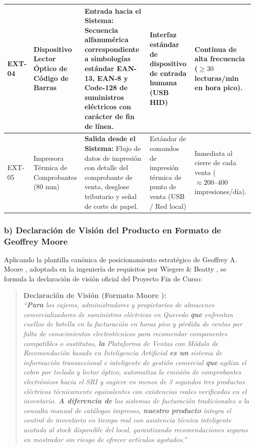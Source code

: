\documentclass[conference,10pt]{IEEEtran}
\begin{document}
\begin{table}[htbp]
\begin{tabularx}{\textwidth}{l >{\raggedright\arraybackslash}p{} Y >{\raggedright\arraybackslash}p{0.18\textwidth} >{\raggedright\arraybackslash}p{0.18\textwidth}}
			\midrule
			EXT-04 & Dispositivo Lector Óptico de Código de Barras & \textbf{Entrada hacia el Sistema:} Secuencia alfanumérica correspondiente a simbologías estándar EAN-13, EAN-8 y Code-128 de suministros eléctricos con carácter de fin de línea. & Interfaz estándar de dispositivo de entrada humana (USB HID) & Continua de alta frecuencia ($\ge 30$ lecturas/min en hora pico). \\
			\midrule
			EXT-05 & Impresora Térmica de Comprobantes (80 mm) & \textbf{Salida desde el Sistema:} Flujo de datos de impresión con detalle del comprobante de venta, desglose tributario y señal de corte de papel. & Estándar de comandos de impresión térmica de punto de venta (USB / Red local) & Inmediata al cierre de cada venta ($\approx 200\text{--}400$ impresiones/día). \\
			\bottomrule
		\end{tabularx}
	\end{table}
	\subsubsection{b) Declaración de Visión del Producto en Formato de Geoffrey Moore}
	Aplicando la plantilla canónica de posicionamiento estratégico de Geoffrey A. Moore \cite{moore2014}, adoptada en la ingeniería de requisitos por Wiegers \& Beatty \cite{wiegers2013}, se formula la declaración de visión oficial del Proyecto Fin de Curso:
	\begin{quote}
		\textbf{Declaración de Visión (Formato Moore \cite{moore2014}):} \\
		\textit{``\textbf{Para} los cajeros, administradores y propietarios de almacenes comercializadores de suministros eléctricos en Quevedo \textbf{que} enfrentan cuellos de botella en la facturación en horas pico y pérdida de ventas por falta de conocimientos electrotécnicos para recomendar componentes compatibles o sustitutos, \textbf{la} Plataforma de Ventas con Módulo de Recomendación basado en Inteligencia Artificial \textbf{es un} sistema de información transaccional e inteligente de gestión comercial \textbf{que} agiliza el cobro por teclado y lector óptico, automatiza la emisión de comprobantes electrónicos hacia el SRI y sugiere en menos de 3 segundos tres productos eléctricos técnicamente equivalentes con existencias reales verificadas en el inventario. \textbf{A diferencia de} los sistemas de facturación tradicionales o la consulta manual de catálogos impresos, \textbf{nuestro producto} integra el control de inventario en tiempo real con asistencia técnica inteligente acotada al stock disponible del local, garantizando recomendaciones seguras en mostrador sin riesgo de ofrecer artículos agotados.''}
	\end{quote}
\end{document}
